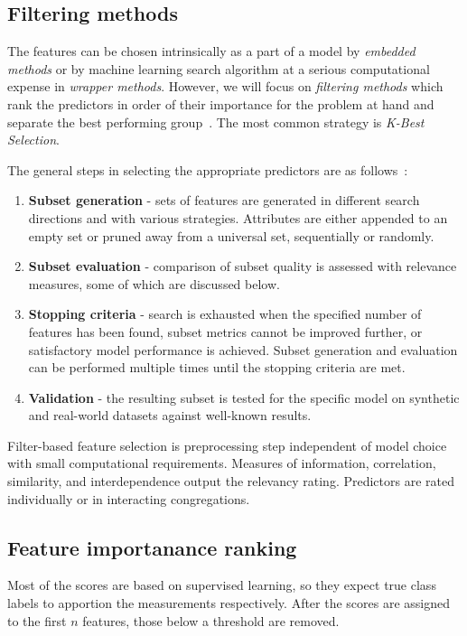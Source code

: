 \subsection{Filtering methods}
The features can be chosen intrinsically as a part of a model by \emph{embedded methods} or by machine learning search algorithm at a serious computational expense in \emph{wrapper methods}. However, we will focus on \emph{filtering methods} which rank the predictors in order of their importance for the problem at hand and separate the best performing group~\cite{johnson_feature_2019}. The most common strategy is \emph{K-Best Selection}.

The general steps in selecting the appropriate predictors are as follows~\cite{nandi_condition_2019}:

\begin{enumerate}
    \itemsep0pt
    \item \textbf{Subset generation} - sets of features are generated in different search directions and with various strategies. Attributes are either appended to an empty set or pruned away from a universal set, sequentially or randomly.
    
    \item \textbf{Subset evaluation} - comparison of subset quality is assessed with relevance measures, some of which are discussed below.

    \item \textbf{Stopping criteria} - search is exhausted when the specified number of features has been found, subset metrics cannot be improved further, or satisfactory model performance is achieved. Subset generation and evaluation can be performed multiple times until the stopping criteria are met.

    \item \textbf{Validation} - the resulting subset is tested for the specific model on synthetic and real-world datasets against well-known results. 
\end{enumerate}

Filter-based feature selection is preprocessing step independent of model choice with small computational requirements. Measures of information, correlation, similarity, and interdependence output the relevancy rating. Predictors are rated individually or in interacting congregations. 

\subsection{Feature importanance ranking}
Most of the scores are based on supervised learning, so they expect true class labels to apportion the measurements respectively. After the scores are assigned to the first $n$ features, those below a threshold are removed. 

